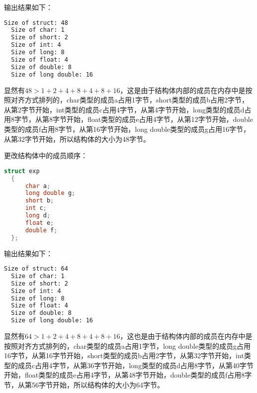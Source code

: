 \documentclass[UTF8]{report}
\begin{document}
输出结果如下：

\begin{lstlisting}[language=bash]
  Size of struct: 48
  Size of char: 1
  Size of short: 2
  Size of int: 4
  Size of long: 8
  Size of float: 4
  Size of double: 8
  Size of long double: 16
\end{lstlisting}

显然有$48 > 1 + 2 + 4 + 8 + 4 + 8 + 16$，这是由于结构体内部的成员在内存中是按照对齐方式排列的，char类型的成员a占用1字节，short类型的成员b占用2字节，从第2字节开始，int类型的成员c占用4字节，从第4字节开始，long类型的成员d占用8字节，从第8字节开始，float类型的成员e占用4字节，从第12字节开始，double类型的成员f占用8字节，从第16字节开始，long double类型的成员g占用16字节，从第32字节开始，所以结构体的大小为48字节。

更改结构体中的成员顺序：

\begin{lstlisting}[language=C]
  struct exp
  {
      char a;
      long double g;
      short b;
      int c;
      long d;
      float e;
      double f;
  };
\end{lstlisting}

输出结果如下：

\begin{lstlisting}[language=bash]
  Size of struct: 64
  Size of char: 1
  Size of short: 2
  Size of int: 4
  Size of long: 8
  Size of float: 4
  Size of double: 8
  Size of long double: 16
\end{lstlisting}

显然有$64 > 1 + 2 + 4 + 8 + 4 + 8 + 16$，这也是由于结构体内部的成员在内存中是按照对齐方式排列的，char类型的成员a占用1字节，long double类型的成员g占用16字节，从第16字节开始，short类型的成员b占用2字节，从第32字节开始，int类型的成员c占用4字节，从第36字节开始，long类型的成员d占用8字节，从第40字节开始，float类型的成员e占用4字节，从第48字节开始，double类型的成员f占用8字节，从第56字节开始，所以结构体的大小为64字节。
\end{document}
